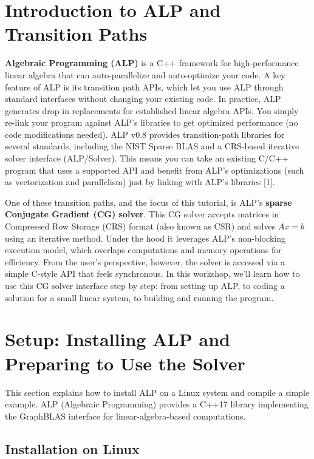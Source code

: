 \section{Introduction to ALP and Transition Paths}\label{sec:intro}

\textbf{Algebraic Programming (ALP)} is a C++ framework for high-performance linear algebra that can auto-parallelize and auto-optimize your code. A key feature of ALP is its transition path APIs, which let you use ALP through standard interfaces without changing your existing code. In practice, ALP generates drop-in replacements for established linear algebra APIs. You simply re-link your program against ALP's libraries to get optimized performance (no code modifications needed). ALP v0.8 provides transition-path libraries for several standards, including the NIST Sparse BLAS and a CRS-based iterative solver interface (ALP/Solver). This means you can take an existing C/C++ program that uses a supported API and benefit from ALP's optimizations (such as vectorization and parallelism) just by linking with ALP's libraries [1].

One of these transition paths, and the focus of this tutorial, is ALP's \textbf{sparse Conjugate Gradient (CG) solver}. This CG solver accepts matrices in Compressed Row Storage (CRS) format (also known as CSR) and solves $Ax=b$ using an iterative method. Under the hood it leverages ALP's non-blocking execution model, which overlaps computations and memory operations for efficiency. From the user's perspective, however, the solver is accessed via a simple C-style API that feels synchronous. In this workshop, we'll learn how to use this CG solver interface step by step: from setting up ALP, to coding a solution for a small linear system, to building and running the program.

\section{Setup: Installing ALP and Preparing to Use the Solver}\label{sec:setup}

This section explains how to install ALP on a Linux system and compile a simple example. ALP (Algebraic Programming) provides a C++17 library implementing the GraphBLAS interface for linear-algebra-based computations.

\subsection{Installation on Linux}

